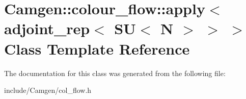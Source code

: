\hypertarget{a00015}{}\section{Camgen\+:\+:colour\+\_\+flow\+:\+:apply$<$ adjoint\+\_\+rep$<$ S\+U$<$ N $>$ $>$ $>$ Class Template Reference}
\label{a00015}


The documentation for this class was generated from the following file\+:\begin{DoxyCompactItemize}
\item 
include/\+Camgen/col\+\_\+flow.\+h\end{DoxyCompactItemize}
